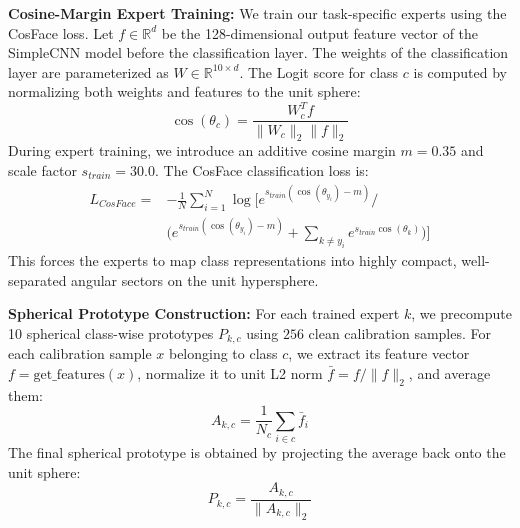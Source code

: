 \documentclass{article}
\theoremstyle{plain}
\theoremstyle{definition}
\theoremstyle{remark}
\begin{document}
\textbf{Cosine-Margin Expert Training:} We train our task-specific experts using the CosFace \cite{wang2018cosface} loss. Let $f \in \mathbb{R}^d$ be the 128-dimensional output feature vector of the SimpleCNN model before the classification layer. The weights of the classification layer are parameterized as $W \in \mathbb{R}^{10 \times d}$. The Logit score for class $c$ is computed by normalizing both weights and features to the unit sphere:
\begin{equation}
\cos(\theta_c) = \frac{W_c^T f}{\|W_c\|_2 \|f\|_2}
\end{equation}
During expert training, we introduce an additive cosine margin $m = 0.35$ and scale factor $s_{train} = 30.0$. The CosFace classification loss is:
\begin{equation}
\begin{aligned}
L_{CosFace} = & -\frac{1}{N} \sum_{i=1}^N \log \Big[ e^{s_{train}(\cos(\theta_{y_i}) - m)} \Big/ \\
& \Big( e^{s_{train}(\cos(\theta_{y_i}) - m)} + \sum_{k \neq y_i} e^{s_{train}\cos(\theta_k)} \Big) \Big]
\end{aligned}
\end{equation}
This forces the experts to map class representations into highly compact, well-separated angular sectors on the unit hypersphere.

\textbf{Spherical Prototype Construction:} For each trained expert $k$, we precompute 10 spherical class-wise prototypes $P_{k,c}$ using $256$ clean calibration samples. For each calibration sample $x$ belonging to class $c$, we extract its feature vector $f = \text{get\_features}(x)$, normalize it to unit L2 norm $\bar{f} = f / \|f\|_2$, and average them:
\begin{equation}
A_{k,c} = \frac{1}{N_c} \sum_{i \in c} \bar{f}_i
\end{equation}
The final spherical prototype is obtained by projecting the average back onto the unit sphere:
\begin{equation}
P_{k,c} = \frac{A_{k,c}}{\|A_{k,c}\|_2}
\end{equation}
\end{document}
